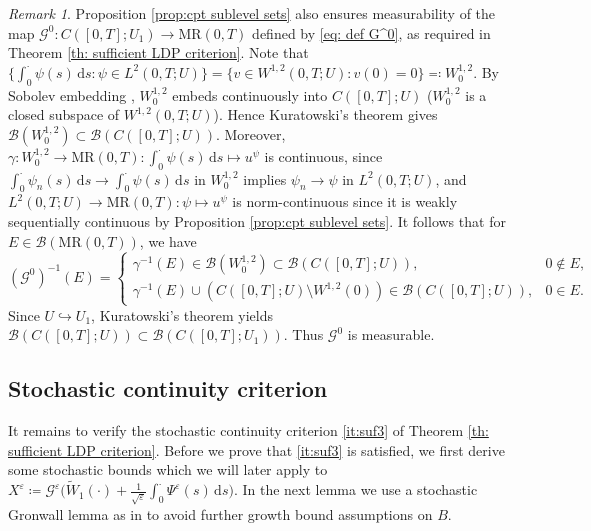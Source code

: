 \documentclass{amsart}
\newcommand{\dd}{\,\mathrm{d}}
\renewcommand{\MR}{\mathrm{MR}}
\newcommand{\<}{\langle}
\newcommand{\?}{\rangle}
\newcommand{\into}{\hookrightarrow}
\theoremstyle{plain}
\theoremstyle{remark}
\newtheorem{remark}[theorem]{Remark}
\theoremstyle{plain}
\numberwithin{equation}{section}
\newcommand{\G}{\mathcal{G}}
\newcommand{\eps}{\varepsilon}
\begin{document}
\begin{remark}
Proposition \ref{prop:cpt sublevel sets} also ensures measurability of the map $\mathcal{G}^0\colon C([0,T];U_1)\to \MR(0,T)$ defined by \eqref{eq: def G^0}, as required in  Theorem \ref{th: sufficient LDP criterion}.
Note that $\{\int_0^\cdot \psi(s)\dd s:\psi \in L^2(0,T;U)\}=\{v\in W^{1,2}(0,T;U): v(0)=0\}\eqqcolon  W^{1,2}_0$.
By Sobolev embedding \cite[Corollary L.4.6]{HNVWvolume3}, $W^{1,2}_0$ embeds continuously into $C([0,T];U)$ ($W^{1,2}_0$ is a closed subspace of $W^{1,2}(0,T;U)$).
Hence Kuratowski's theorem \cite[Th. 15.1]{kechris95} gives $\mathcal{B}(W^{1,2}_0)\subset \mathcal{B}(C([0,T];U))$.
Moreover, $\gamma\colon W^{1,2}_0\to \MR(0,T)\colon \int_0^\cdot \psi(s)\dd s\mapsto u^\psi$ is continuous, since $\int_0^\cdot \psi_n(s)\dd s\to \int_0^\cdot \psi(s)\dd s$ in $W^{1,2}_0$ implies $\psi_n\to\psi$ in $L^2(0,T;U)$, and $L^2(0,T;U)\to\MR(0,T)\colon \psi\mapsto u^\psi$ is norm-continuous since it is weakly sequentially continuous by Proposition \ref{prop:cpt sublevel sets}. It follows that for $E\in \mathcal{B}(\MR(0,T))$, we have
\[
\left(\mathcal{G}^0\right)^{-1}(E)
=\begin{cases}
\gamma^{-1}(E)\in \mathcal{B}(W^{1,2}_0)\subset \mathcal{B}(C([0,T];U)) , &   0\notin E,\\
\gamma^{-1}(E)\cup (C([0,T];U)\setminus W^{1,2}(0))\in \mathcal{B}(C([0,T];U)), & 0\in E.
\end{cases}
\]
Since $U\into U_1$, Kuratowski's theorem yields $\mathcal{B}(C([0,T];U))\subset \mathcal{B}(C([0,T];U_1))$. Thus  $\mathcal{G}^0$ is measurable.
\end{remark}

\subsection{Stochastic continuity criterion}\label{ss:stochcont}

It remains to verify the stochastic continuity criterion \ref{it:suf3} of Theorem \ref{th: sufficient LDP criterion}.
Before we prove that \ref{it:suf3} is satisfied, we first derive some stochastic bounds which we will later apply to  $X^\eps\coloneqq \G^\eps\big(\tilde{W}_1(\cdot)+\frac{1}{\sqrt{\eps}}\int_0^{\cdot} \Psi^\eps(s)\dd s\big)$. In the next lemma we use a stochastic Gronwall lemma as in \cite{AV22variational} to avoid further growth bound assumptions on $B$.
\end{document}
